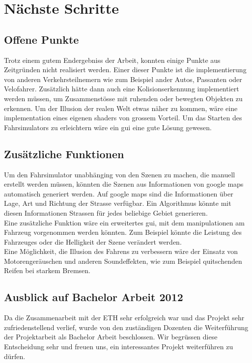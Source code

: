 \section{Nächste Schritte}
\subsection{Offene Punkte}
Trotz einem gutem Endergebniss der Arbeit, konnten einige Punkte aus Zeitgründen nicht realisiert werden. Einer dieser Punkte ist die implementierung von anderen Verkehrsteilnemern wie zum Beispiel ander Autos, Passanten oder Velofahrer. Zusätzlich hätte dann auch eine Kolisionserkennung implementiert werden müssen, um Zusammenstösse mit ruhenden oder bewegten Objekten zu erkennen. Um der Illusion der realen Welt etwas näher zu kommen, wäre eine implementation eines eigenen \glspl{shader} von grossem Vorteil. Um das Starten des Fahrsimulators zu erleichtern wäre ein \gls{gui} eine gute Lösung gewesen. 
\subsection{Zusätzliche Funktionen}
Um den Fahrsimulator unabhänging von den Szenen zu machen, die manuell erstellt werden müssen, könnten die Szenen aus Informationen von google maps automatisch generiert werden. Auf google maps sind die Informationen über Lage, Art und Richtung der Strasse verfügbar. Ein Algorithmus könnte mit diesen Informationen Strassen für jedes beliebige Gebiet generieren. \\
Eine zusätzliche Funktion wäre ein erweitertes \gls{gui}, mit dem manipulationen am Fahrzeug vorgenommen werden könnten. Zum Beispiel könnte die Leistung des Fahrzeuges oder die Helligkeit der Szene verändert werden.\\
Eine Möglichkeit, die Illusion des Fahrens zu verbessern wäre der Einsatz von Motorengeräuschen und anderen Soundeffekten, wie zum Beispiel quitschenden Reifen bei starkem Bremsen.
\subsection{Ausblick auf Bachelor Arbeit 2012}
Da die Zusammenarbeit mit der ETH sehr erfolgreich war und das Projekt sehr zufriedenstellend verlief, wurde von den zuständigen Dozenten die Weiterführung der Projektarbeit als Bachelor Arbeit beschlossen. Wir begrüssen diese Entscheidung sehr und freuen uns, ein interessantes Projekt weiterführen zu dürfen.